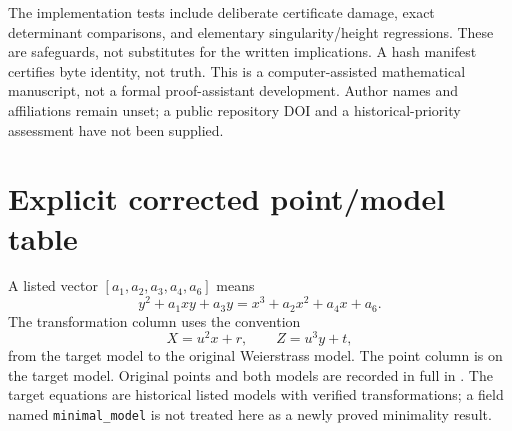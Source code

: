 \documentclass[11pt,letterpaper]{article}
\theoremstyle{definition}\newtheorem{definition}[theorem]{Definition}
\theoremstyle{remark}\newtheorem{remark}[theorem]{Remark}
\begin{document}
The implementation tests include deliberate certificate damage, exact determinant comparisons, and elementary singularity/height regressions. These are safeguards, not substitutes for the written implications. A hash manifest certifies byte identity, not truth. This is a computer-assisted mathematical manuscript, not a formal proof-assistant development. Author names and affiliations remain unset; a public repository DOI and a historical-priority assessment have not been supplied.

\appendix
\section{Explicit corrected point/model table}\label{app:models}
A listed vector $[a_1,a_2,a_3,a_4,a_6]$ means
\[
y^2+a_1xy+a_3y=x^3+a_2x^2+a_4x+a_6.
\]
The transformation column uses the convention
\[
X=u^2x+r,\qquad Z=u^3y+t,
\]
from the target model to the original Weierstrass model. The point column is on the target model. Original points and both models are recorded in full in . The target equations are historical listed models with verified transformations; a field named \texttt{minimal\_model} is not treated here as a newly proved minimality result.
\end{document}
